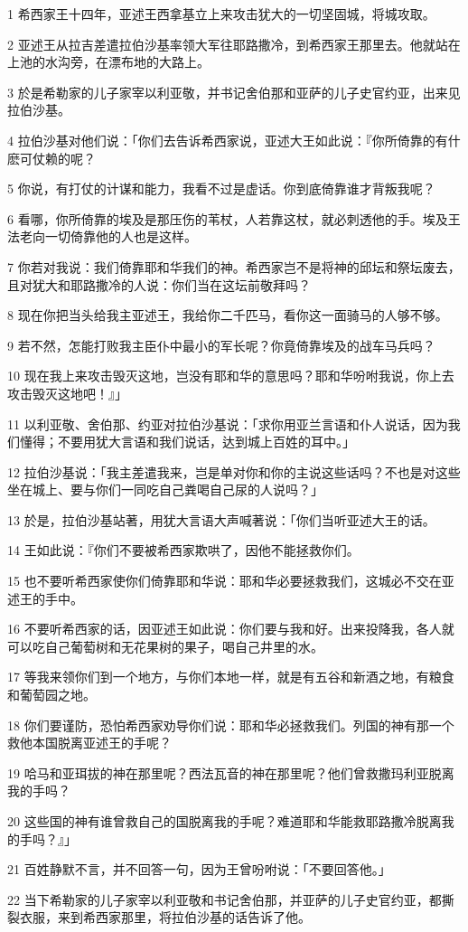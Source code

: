 \par 1 希西家王十四年，亚述王西拿基立上来攻击犹大的一切坚固城，将城攻取。
\par 2 亚述王从拉吉差遣拉伯沙基率领大军往耶路撒冷，到希西家王那里去。他就站在上池的水沟旁，在漂布地的大路上。
\par 3 於是希勒家的儿子家宰以利亚敬，并书记舍伯那和亚萨的儿子史官约亚，出来见拉伯沙基。
\par 4 拉伯沙基对他们说：「你们去告诉希西家说，亚述大王如此说：『你所倚靠的有什麽可仗赖的呢？
\par 5 你说，有打仗的计谋和能力，我看不过是虚话。你到底倚靠谁才背叛我呢？
\par 6 看哪，你所倚靠的埃及是那压伤的苇杖，人若靠这杖，就必刺透他的手。埃及王法老向一切倚靠他的人也是这样。
\par 7 你若对我说：我们倚靠耶和华我们的神。希西家岂不是将神的邱坛和祭坛废去，且对犹大和耶路撒冷的人说：你们当在这坛前敬拜吗？
\par 8 现在你把当头给我主亚述王，我给你二千匹马，看你这一面骑马的人够不够。
\par 9 若不然，怎能打败我主臣仆中最小的军长呢？你竟倚靠埃及的战车马兵吗？
\par 10 现在我上来攻击毁灭这地，岂没有耶和华的意思吗？耶和华吩咐我说，你上去攻击毁灭这地吧！』」
\par 11 以利亚敬、舍伯那、约亚对拉伯沙基说：「求你用亚兰言语和仆人说话，因为我们懂得；不要用犹大言语和我们说话，达到城上百姓的耳中。」
\par 12 拉伯沙基说：「我主差遣我来，岂是单对你和你的主说这些话吗？不也是对这些坐在城上、要与你们一同吃自己粪喝自己尿的人说吗？」
\par 13 於是，拉伯沙基站著，用犹大言语大声喊著说：「你们当听亚述大王的话。
\par 14 王如此说：『你们不要被希西家欺哄了，因他不能拯救你们。
\par 15 也不要听希西家使你们倚靠耶和华说：耶和华必要拯救我们，这城必不交在亚述王的手中。
\par 16 不要听希西家的话，因亚述王如此说：你们要与我和好。出来投降我，各人就可以吃自己葡萄树和无花果树的果子，喝自己井里的水。
\par 17 等我来领你们到一个地方，与你们本地一样，就是有五谷和新酒之地，有粮食和葡萄园之地。
\par 18 你们要谨防，恐怕希西家劝导你们说：耶和华必拯救我们。列国的神有那一个救他本国脱离亚述王的手呢？
\par 19 哈马和亚珥拔的神在那里呢？西法瓦音的神在那里呢？他们曾救撒玛利亚脱离我的手吗？
\par 20 这些国的神有谁曾救自己的国脱离我的手呢？难道耶和华能救耶路撒冷脱离我的手吗？』」
\par 21 百姓静默不言，并不回答一句，因为王曾吩咐说：「不要回答他。」
\par 22 当下希勒家的儿子家宰以利亚敬和书记舍伯那，并亚萨的儿子史官约亚，都撕裂衣服，来到希西家那里，将拉伯沙基的话告诉了他。

